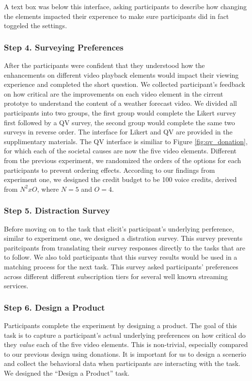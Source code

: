 A text box was below this interface, asking participants to describe how changing the elements impacted their experence to make sure participants did in fact toggeled the settings.

\subsubsection{Step 4. Surveying Preferences}
After the participants were confident that they understood how the enhancements on different video playback elements would impact their viewing experience and completed the short question. We collected participant's feedback on how critical are the improvements on each video element in the cirrent prototye to understand the content of a weather forecast video. We divided all participants into two groups, the first group would complete the Likert survey first followed by a QV survey, the second group would complete the same two surveys in reverse order. The interface for Likert and QV are provided in the supplimentary materials. The QV interface is similiar to Figure \ref{fig:qv_donation}, for which each of the societal causes are now the five video elements. Different from the previous experiment, we randomized the orders of the options for each participants to prevent ordering effects. According to our findings from experiment one, we designed the credit budget to be 100 voice credits, derived from $N^2 x O$, where $N=5$ and $O=4$.

\subsubsection{Step 5. Distraction Survey}
Before moving on to the task that elicit's participant's underlying perference, similar to experiment one, we designed a distration survey. This survey prevents paritcipants from translating their survey responses directly to the tasks that are to follow. We also told participants that this survey results would be used in a matching process for the next task. This survey asked participants' preferences across different different subscription tiers for several well known streaming services.

\subsubsection{Step 6. Design a Product}
Participants complete the experiment by designing a product. The goal of this task is to capture a participant's actual underlying preferences on how critical do they \textit{value} each of the five video elements. This is non-trivial, especially compared to our previous design using donations. It is important for us to design a scenerio and collect the behavioral data when participants are interacting with the task. We designed the ``Design a Product'' task.

